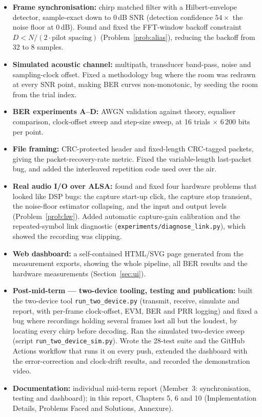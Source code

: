 \documentclass[11pt,a4paper]{report}
\begin{document}
\begin{itemize}
    \item \textbf{Frame synchronisation:} chirp matched filter with a Hilbert-envelope
    detector, sample-exact down to 0\,dB SNR (detection confidence $54\times$ the noise
    floor at 0\,dB). Found and fixed the FFT-window backoff constraint
    $D<N/(2\cdot\text{pilot spacing})$ (Problem~\ref{prob:alias}), reducing the backoff
    from 32 to 8 samples.
    \item \textbf{Simulated acoustic channel:} multipath, transducer band-pass, noise and
    sampling-clock offset. Fixed a methodology bug where the room was redrawn at every
    SNR point, making BER curves non-monotonic, by seeding the room from the trial index.
    \item \textbf{BER experiments A--D:} AWGN validation against theory, equaliser
    comparison, clock-offset sweep and step-size sweep, at 16 trials $\times$ 6\,200 bits
    per point.
    \item \textbf{File framing:} CRC-protected header and fixed-length CRC-tagged
    packets, giving the packet-recovery-rate metric. Fixed the variable-length
    last-packet bug, and added the interleaved repetition code used over the air.
    \item \textbf{Real audio I/O over ALSA:} found and fixed four hardware problems that
    looked like DSP bugs: the capture start-up click, the capture stop transient, the
    noise-floor estimator collapsing, and the input and output levels
    (Problem~\ref{prob:hw}). Added automatic capture-gain calibration and the
    repeated-symbol link diagnostic (\texttt{experiments/diagnose\_link.py}), which
    showed the recording was clipping.
    \item \textbf{Web dashboard:} a self-contained HTML/SVG page generated from the
    measurement exports, showing the whole pipeline, all BER results and the hardware
    measurements (Section~\ref{sec:ui}).
    \item \textbf{Post-mid-term --- two-device tooling, testing and publication:}
    built the two-device tool \texttt{run\_two\_device.py} (transmit, receive, simulate and
    report, with per-frame clock-offset, EVM, BER and PRR logging) and fixed a bug where
    recordings holding several frames lost all but the loudest, by locating every chirp
    before decoding. Ran the simulated two-device sweep
    (script \texttt{run\_two\_device\_sim.py}). Wrote the 28-test suite and the
    GitHub Actions workflow that runs it on every push, extended the dashboard with the
    error-correction and clock-drift results, and recorded the demonstration video.
    \item \textbf{Documentation:} individual mid-term report (Member~3: synchronisation,
    testing and dashboard); in this report, Chapters 5, 6 and 10 (Implementation
    Details, Problems Faced and Solutions, Annexure).
\end{itemize}
\end{document}
